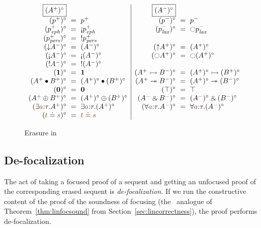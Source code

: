 \begin{figure}
{\small \[
\begin{array}{rcl|rcl}
\fbox{$(A^+)^\circ$} & & &
\fbox{$(A^-)^\circ$} & & 
\\
(p^+)^\circ & \!\!\!=\!\!\! & p^+ &
(p^-)^\circ & \!\!\!=\!\!\! & p^- \\
(p^+_\meph)^\circ & \!\!\!=\!\!\! & {\gnab}p^+_\meph &
(p^-_\mlax)^\circ & \!\!\!=\!\!\! & {\ocircle}p^-_\mlax 
\\
(p^+_\mpers)^\circ & \!\!\!=\!\!\! & {!}p^+_\mpers &
& & 
\\
({\downarrow}A^-)^\circ & \!\!\!=\!\!\! & (A^-)^\circ &
({\uparrow}A^+)^\circ & \!\!\!=\!\!\! & (A^+)^\circ 
\\
({\gnab}A^-)^\circ & \!\!\!=\!\!\! & {\gnab}(A^-)^\circ &
({\ocircle}A^+)^\circ & \!\!\!=\!\!\! & {\ocircle}(A^+)^\circ 
\\
({!}A^-)^\circ & \!\!\!=\!\!\! & {!}(A^-)^\circ &
& & 
\\
(\one)^\circ & \!\!\!=\!\!\! & \one &
(A^+ \lefti B^-)^\circ & \!\!\!=\!\!\! & (A^+)^\circ \lefti (B^+)^\circ 
\\
(A^+ \fuse B^+)^\circ & \!\!\!=\!\!\! & (A^+)^\circ \fuse (B^+)^\circ &
(A^+ \righti B^-)^\circ & \!\!\!=\!\!\! & (A^+)^\circ \righti (B^-)^\circ 
\\
(\zero)^\circ & \!\!\!=\!\!\! & \zero &
(\top)^\circ & \!\!\!=\!\!\! & \top 
\\
(A^+ \oplus B^+)^\circ & \!\!\!=\!\!\! & (A^+)^\circ \oplus (B^+)^\circ &
(A^- \with B^-)^\circ & \!\!\!=\!\!\! & (A^-)^\circ \with (B^-)^\circ 
\\
(\exists\lf a{:}\tau.A^+)^\circ & \!\!\!=\!\!\! & \exists\lf a{:}\tau. (A^+)^\circ &
(\forall\lf a{:}\tau.A^-)^\circ & \!\!\!=\!\!\! & \forall\lf a{:}\tau. (A^-)^\circ 
\\
(\lf t \doteq \lf s)^\circ & \!\!\!=\!\!\! & \lf t \doteq \lf s &
& &
\end{array}
\]}

\caption{Erasure in \ollll}
\label{fig:ord-erasure}
\end{figure}


\subsection{De-focalization}

The act of taking a focused proof of a sequent and getting an unfocused
proof of the corresponding erased sequent is {\it de-focalization}.
If we run the constructive content of 
the proof of the soundness of focusing (the \ollll~analogue of
Theorem~\ref{thm:linfocsound} from Section~\ref{sec:lincorrectness}),
the proof performs de-focalization.

